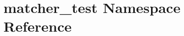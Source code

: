 \hypertarget{namespacematcher__test}{}\section{matcher\+\_\+test Namespace Reference}
\label{namespacematcher__test}
